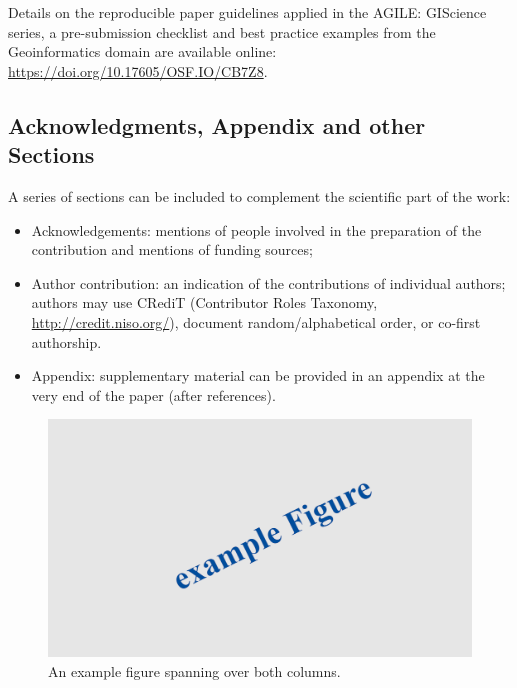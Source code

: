 \documentclass[agile, final]{copernicus-agile}
\begin{document}
Details on the reproducible paper guidelines applied in the AGILE: GIScience series, a pre-submission checklist and best practice examples from the Geoinformatics domain are available online: \url{https://doi.org/10.17605/OSF.IO/CB7Z8}.

\subsection{Acknowledgments, Appendix and other Sections}
A series of sections can be included to complement the scientific part of the work:
\begin{itemize}[itemsep=0em plus0.5em,topsep=0.2em plus0.5em]
\item Acknowledgements: mentions of people involved in the preparation of the contribution and mentions of funding sources;
\item  Author contribution: an indication of the contributions of individual authors; authors may use CRediT (Contributor Roles Taxonomy, \url{http://credit.niso.org/}), document random/alphabetical order, or co-first authorship.
\item  Appendix: supplementary material can be provided in an appendix at the very end of the paper (after references).
\end{itemize}

\begin{figure}[ht]
  \includegraphics[width=16cm]{figures/example_figure-2.png}
\caption{An example figure spanning over both columns.}
\label{fig:1}       %
\end{figure}
%
\end{document}
